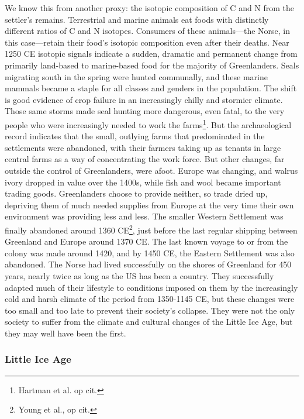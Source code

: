 We know this from another proxy: the isotopic composition of C and N from the settler's remains. Terrestrial and marine animals eat foods with distinctly different ratios of C and N isotopes. Consumers of these animals---the Norse, in this case---retain their food's isotopic composition even after their deaths. Near 1250 CE isotopic signals indicate a sudden, dramatic and permanent change from primarily land-based to marine-based food for the majority of Greenlanders. Seals migrating south in the spring were hunted communally, and these marine mammals became a staple for all classes and genders in the population. The shift is good evidence of crop failure in an increasingly chilly and stormier climate. Those same storms made seal hunting more dangerous, even fatal, to the very people who were increasingly needed to work the farms\footnote{Hartman et al. op cit.}. But the archaeological record indicates that the small, outlying farms that predominated in the  settlements were abandoned, with their farmers taking up as tenants in large central farms as a way of concentrating the work force. But other changes, far outside the control of Greenlanders, were afoot. Europe was changing, and walrus ivory dropped in value over the 1400s, while fish and wool became important trading goods. Greenlanders choose to provide neither, so trade dried up, depriving them of much needed supplies from Europe at the very time their own environment was providing less and less. The smaller Western Settlement was finally abandoned around 1360 CE\footnote{Young et al., op cit.}, just before the last regular shipping between Greenland and Europe around 1370 CE. The last known voyage to or from the colony was made around 1420, and by 1450 CE, the Eastern Settlement was also abandoned. The Norse had lived successfully on the shores of Greenland for 450 years, nearly twice as long as the US has been a country. They successfully adapted much of their lifestyle to conditions imposed on them by the increasingly cold and harsh climate of the period from 1350-1145 CE, but these changes were too small and too late to prevent their society's collapse. They were not the only society to suffer from the climate and cultural changes of the Little Ice Age, but they may well have been the first.\\

\subsubsection{Little Ice Age}
